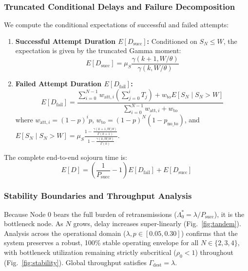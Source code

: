 \documentclass[journal,compsoc]{IEEEtran}
\begin{document}
\subsubsection{Truncated Conditional Delays and Failure Decomposition}
We compute the conditional expectations of successful and failed attempts:
\begin{enumerate}
    \item \textbf{Successful Attempt Duration $E[D_{\text{succ}}]$:} Conditioned on $S_N \le W$, the expectation is given by the truncated Gamma moment:
    \begin{equation}
    E[D_{\text{succ}}] = \mu_S \frac{\gamma(k+1, W/\theta)}{\gamma(k, W/\theta)}
    \label{eq:truncated_gamma_succ}
    \end{equation}
    \item \textbf{Failed Attempt Duration $E[D_{\text{fail}}]$:}
    \begin{equation}
    E[D_{\text{fail}}] = \frac{\sum_{i=0}^{N-1} w_{\text{att}, i} \left(\sum_{j=0}^i T_j\right) + w_{\text{to}} E[S_N \mid S_N > W]}{\sum_{i=0}^{N-1} w_{\text{att}, i} + w_{\text{to}}}
    \end{equation}
    where $w_{\text{att}, i} = (1-p)^i p$, $w_{\text{to}} = (1-p)^N (1 - p_{\text{no\_to}})$, and $E[S_N \mid S_N > W] = \mu_S \frac{1 - \frac{\gamma(k+1, W/\theta)}{\Gamma(k+1)}}{1 - \frac{\gamma(k, W/\theta)}{\Gamma(k)}}$.
\end{enumerate}
The complete end-to-end sojourn time is:
\begin{equation}
E[D] = \left(\frac{1}{P_{\text{succ}}} - 1\right) E[D_{\text{fail}}] + E[D_{\text{succ}}]
\end{equation}

\subsubsection{Stability Boundaries and Throughput Analysis}
Because Node 0 bears the full burden of retransmissions ($\Lambda_0^* = \lambda / P_{\text{succ}}$), it is the bottleneck node. As $N$ grows, delay increases super-linearly (Fig.~\ref{fig:tandem}). Analysis across the operational domain ($\lambda, p \in [0.05, 0.30]$) confirms that the system preserves a robust, 100\% stable operating envelope for all $N \in \{2, 3, 4\}$, with bottleneck utilization remaining strictly subcritical ($\rho_0 < 1$) throughout (Fig.~\ref{fig:stability}). Global throughput satisfies $\Gamma_{\text{dest}} = \lambda$.
\end{document}
